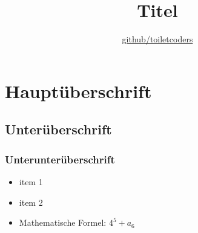 \documentclass{scrreprt}
\title{\textbf{Titel}}
\author{\href{https://github.com/toiletcoders}{\color{black}github/toiletcoders}}
\date{}
\begin{document}
\maketitle
\pagebreak
\renewcommand{\contentsname}{Inhaltsverzeichnis}
\setcounter{tocdepth}{1}
\tableofcontents
{}
\pagebreak
{}
\chapter{Hauptüberschrift}
\section{Unterüberschrift}
\subsection{Unterunterüberschrift}
\begin{itemize}
    \item item 1
    \item item 2
    \item Mathematische Formel: $4^{5} + a_{6}$
\end{itemize}
\end{document}
